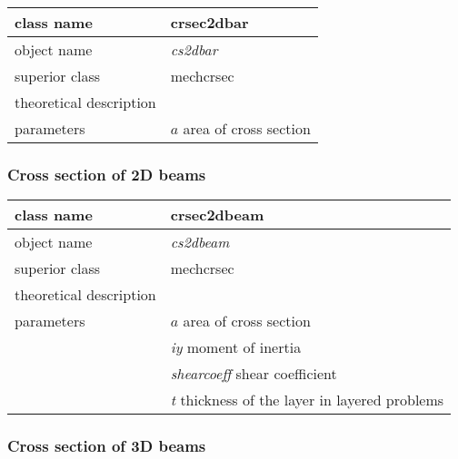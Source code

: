 \begin{center}
\begin{tabular}{|l|l|}
\hline
class name & {\sf crsec2dbar}\index{class!{\sf crsec2dbar}}
\\ \hline
object name & {\it cs2dbar}\index{instance!{\it cs2dbar}}
\\ \hline
superior class & {\sf mechcrsec}
\\ \hline
theoretical description &
\\ \hline
parameters & {\it $a$ } area of cross section
\\ \hline
\end{tabular}
\end{center}



\subsubsection{Cross section of 2D beams}

\begin{center}
\begin{tabular}{|l|l|}
\hline
class name & {\sf crsec2dbeam}\index{class!{\sf crsec2dbeam}}
\\ \hline
object name & {\it cs2dbeam}\index{instance!{\it cs2dbeam}}
\\ \hline
superior class & {\sf mechcrsec}
\\ \hline
theoretical description &
\\ \hline
parameters & {\it $a$ } area of cross section
\\
 & {\it iy} moment of inertia
\\
 & {\it shearcoeff} shear coefficient
\\
 & {\it t} thickness of the layer in layered problems
\\ \hline
\end{tabular}
\end{center}


\subsubsection{Cross section of 3D beams}

